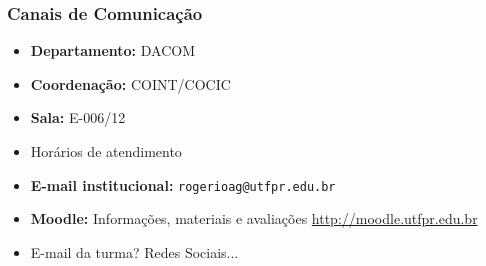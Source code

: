 \documentclass{beamer}
\begin{document}
\begin{frame}
	\frametitle{Canais de Comunicação}
	\fontsize{14pt}{7.2}\selectfont
	\begin{minipage}[t][\textheight][t]{\textwidth}
		\begin{itemize}
			\item \textbf{Departamento:} DACOM
			\item \textbf{Coordenação:} COINT/COCIC
			\item \textbf{Sala:} E-006/12
			\item Horários de atendimento
			\item \textbf{E-mail institucional:} \texttt{rogerioag@utfpr.edu.br}
			\item \textbf{Moodle:} Informações, materiais e avaliações \url{http://moodle.utfpr.edu.br}
			\item E-mail da turma? Redes Sociais...
		\end{itemize}
	\end{minipage}
\end{frame}
\end{document}
